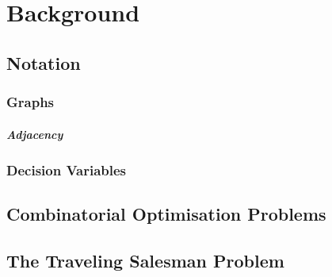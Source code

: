 \chapter{Background}
\section{Notation}
\label{chap:BG}
\subsection{Graphs}

\paragraph{Adjacency}
\subsection{Decision Variables}

\section{Combinatorial Optimisation Problems}
\label{sec:CO}
\section{The Traveling Salesman Problem}
\label{sec:TSP}


